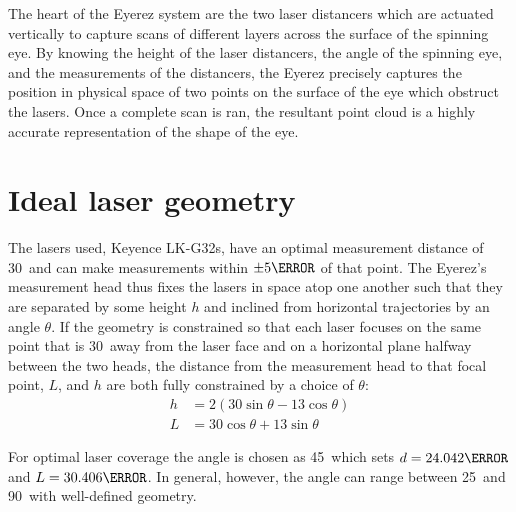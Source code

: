

The heart of the Eyerez system are the two laser distancers which are
actuated vertically to capture scans of different layers across the
surface of the spinning eye. By knowing the height of the laser
distancers, the angle of the spinning eye, and the measurements of the
distancers, the Eyerez precisely captures the position in physical
space of two points on the surface of the eye which obstruct the
lasers. Once a complete scan is ran, the resultant point cloud is a
highly accurate representation of the shape of the eye.


\section{Ideal laser geometry}
\label{sec:laser-geometry}

The lasers used, Keyence LK-G32s, have an optimal measurement distance
of 30\mm\ and can make measurements within $\pm5 \mm$ of that
point. The Eyerez's measurement head thus fixes the lasers in space
atop one another such that they are separated by some height $h$ and
inclined from horizontal trajectories by an angle $\theta$. If the
geometry is constrained so that each laser focuses on the same point
that is 30\mm\ away from the laser face and on a horizontal plane
halfway between the two heads, the distance from the measurement head
to that focal point, $L$, and $h$ are both fully constrained by a
choice of $\theta$:
\begin{align}
  h &= 2\left(30 \sin\theta - 13\cos\theta\right) \\
  L &= 30 \cos\theta + 13 \sin\theta
\end{align}

For optimal laser coverage the angle is chosen as 45\degrees\ which
sets $d = 24.042\mm$ and $L = 30.406\mm$. In general, however, the
angle can range between 25\degrees\ and 90\degrees\ with well-defined
geometry. 


